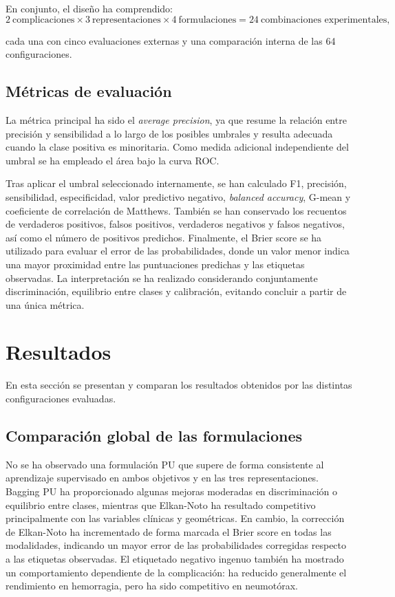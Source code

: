 En conjunto, el diseño ha comprendido:
\[
2\ \text{complicaciones}
\times 3\ \text{representaciones}
\times 4\ \text{formulaciones}
=24\ \text{combinaciones experimentales},
\]

cada una con cinco evaluaciones externas y una comparación interna de las 64 configuraciones.

\subsection{Métricas de evaluación}

La métrica principal ha sido el \textit{average precision}, ya que resume la relación entre precisión y sensibilidad a lo largo de los posibles umbrales y resulta adecuada cuando la clase positiva es minoritaria. Como medida adicional independiente del umbral se ha empleado el área bajo la curva ROC.

Tras aplicar el umbral seleccionado internamente, se han calculado F1, precisión, sensibilidad, especificidad, valor predictivo negativo, \textit{balanced accuracy}, G-mean y coeficiente de correlación de Matthews. También se han conservado los recuentos de verdaderos positivos, falsos positivos, verdaderos negativos y falsos negativos, así como el número de positivos predichos. Finalmente, el Brier score se ha utilizado para evaluar el error de las probabilidades, donde un valor menor indica una mayor proximidad entre las puntuaciones predichas y las etiquetas observadas. La interpretación se ha realizado considerando conjuntamente discriminación, equilibrio entre clases y calibración, evitando concluir a partir de una única métrica.

\section{Resultados}

En esta sección se presentan y comparan los resultados obtenidos por las distintas configuraciones evaluadas.

\subsection{Comparación global de las formulaciones}

No se ha observado una formulación PU que supere de forma consistente al aprendizaje supervisado en ambos objetivos y en las tres representaciones. Bagging PU ha proporcionado algunas mejoras moderadas en discriminación o equilibrio entre clases, mientras que Elkan-Noto ha resultado competitivo principalmente con las variables clínicas y geométricas. En cambio, la corrección de Elkan-Noto ha incrementado de forma marcada el Brier score en todas las modalidades, indicando un mayor error de las probabilidades corregidas respecto a las etiquetas observadas. El etiquetado negativo ingenuo también ha mostrado un comportamiento dependiente de la complicación: ha reducido generalmente el rendimiento en hemorragia, pero ha sido competitivo en neumotórax.

